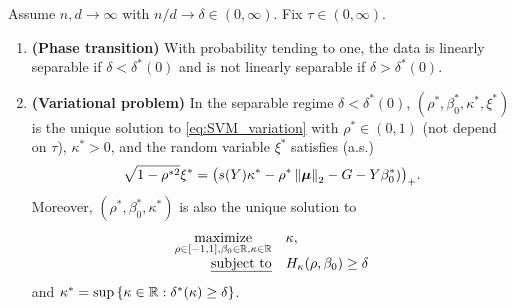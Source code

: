 \begin{thm} \label{thm:SVM_main}
    Assume $n, d \to \infty$ with $n/d \to \delta \in (0, \infty)$. Fix $\tau \in (0, \infty)$. 
    \begin{enumerate}[label=(\alph*)]
        \item \label{thm:SVM_main_trans}
        \textbf{(Phase transition)} With probability tending to one, the data is linearly separable if $\delta < \delta^*(0)$ and is not linearly separable if $\delta > \delta^*(0)$.

        \item \label{thm:SVM_main_var} 
        \textbf{(Variational problem)} In the separable regime $\delta < \delta^*(0)$, $(\rho^*, \beta_0^*, \kappa^*, \xi^*)$ is the unique solution to \cref{eq:SVM_variation} with $\rho^* \in (0, 1)$ (not depend on $\tau$), $\kappa^* > 0$, and the random variable $\xi^*$ satisfies (a.s.)
        \begin{equation}\label{eq:SVM_main_xi_star}
            \sqrt{1 - \rho^{*2}} \xi^* = \bigl( s(Y) \kappa^* - \rho^*\left\|{{\boldsymbol{\mu}}}\right\|_2 - G - Y \beta_0^*) \bigr)_+.
        \end{equation}
        Moreover, $(\rho^*, \beta_0^*, \kappa^*)$ is also the unique solution to
        \begin{equation}\label{eq:SVM_asymp_simple}
        \begin{array}{rl}
        \operatorname*{\mathrm{maximize}}\limits_{\rho \in [-1, 1], \beta_0 \in \mathbb{R}, \kappa \in \mathbb{R}} & \kappa, \\
        \text{\emph{subject to}} & H_\kappa(\rho, \beta_0) \ge \delta
        \end{array}
        \end{equation}
        and $\kappa^* = \sup\left\{ \kappa \in \mathbb{R}: \delta^*(\kappa) \ge \delta \right\}$.
        

\end{enumerate}
\end{thm}
